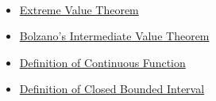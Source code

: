 \begin{remark*}[Dependencies]~\\
\begin{itemize}
  \item \hyperref[thm:extreme-value-theorem]{Extreme Value Theorem}
  \item \hyperref[thm:bolzano-intermediate-value]{Bolzano's Intermediate Value Theorem}
  \item \hyperref[def:continuous-function]{Definition of Continuous Function}
  \item \hyperref[def:closed-bounded-interval]{Definition of Closed Bounded Interval}
\end{itemize}
\end{remark*}
